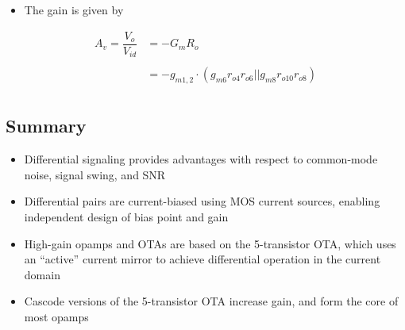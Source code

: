 \documentclass[11pt]{article}
\providecommand{\tightlist}{%
      \setlength{\itemsep}{0pt}\setlength{\parskip}{0pt}}
\begin{document}
\begin{itemize}
\tightlist
\item
  The gain is given by
\end{itemize}

\begin{align}
A_v  = \dfrac{V_o}{V_{id}} &= -G_m R_o\\
\\
&= \boxed{-g_{m1,2}\cdot( g_{m6}r_{o4}r_{o6}|| g_{m8}r_{o10}r_{o8})}\\
\end{align}

    \hypertarget{summary}{%
\subsection{Summary}\label{summary}}

    \begin{itemize}
\tightlist
\item
  Differential signaling provides advantages with respect to common-mode
  noise, signal swing, and SNR
\item
  Differential pairs are current-biased using MOS current sources,
  enabling independent design of bias point and gain
\item
  High-gain opamps and OTAs are based on the 5-transistor OTA, which
  uses an ``active'' current mirror to achieve differential operation in
  the current domain
\item
  Cascode versions of the 5-transistor OTA increase gain, and form the
  core of most opamps
\end{itemize}


    
    
    
\end{document}
